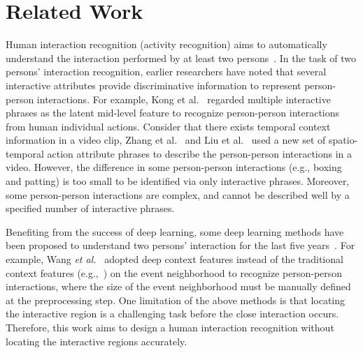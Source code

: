 \documentclass[9pt,journal,letterpaper,twocolumn]{IEEEtran}
\begin{document}
	
\vspace{-2mm}
	\section{Related Work}
	\label{RW}




	{










		Human interaction recognition (activity recognition) aims to automatically
		understand the interaction performed by at least two persons~\cite{chang2015learning}.
		In the task of two persons' interaction recognition, earlier researchers have noted that several interactive attributes provide discriminative information to represent person-person interactions. For example, Kong et al.~\cite{kong2014interactive,kong2012leraning} regarded multiple interactive phrases as the latent mid-level feature to recognize person-person interactions from human individual actions. Consider that there exists temporal context information in a video clip, Zhang et al.~\cite{zhang2012spatio} and Liu et al.~\cite{liu2011recognizing} used a new set of spatio-temporal action attribute phrases to describe the person-person interactions in a video. However, the difference in some person-person interactions (e.g., boxing and patting) is too small to be identified via only interactive phrases. Moreover, some person-person interactions are complex, and cannot be described well by a specified number of interactive phrases.  
		
		Benefiting from the success of deep learning, some deep learning methods have been proposed to understand two persons' interaction for the last five years~\cite{wang2015hierarchical,ke2016spatial}. For example, Wang {\em et al.}~\cite{wang2015hierarchical} adopted deep context features instead of the traditional context features (e.g.,~\cite{lan2010retrieving}) on the event neighborhood to recognize person-person interactions, where the size of the event neighborhood must be manually defined at the preprocessing step. One limitation of the above methods is that locating the interactive region is a challenging task before the close interaction occurs. Therefore, this work aims to design a human interaction recognition without locating the interactive regions accurately. 
		
		
		
}
\end{document}
